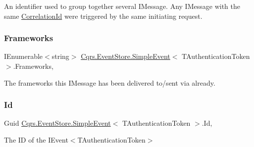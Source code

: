 An identifier used to group together several I\+Message. Any I\+Message with the same \hyperlink{classCqrs_1_1EventStore_1_1SimpleEvent_aa96b900b0fef8e6b2f6af81b5ce99f16_aa96b900b0fef8e6b2f6af81b5ce99f16}{Correlation\+Id} were triggered by the same initiating request. 

\mbox{\label{classCqrs_1_1EventStore_1_1SimpleEvent_ac9f0b878d05f7a3fde9560ae9477c9ec_ac9f0b878d05f7a3fde9560ae9477c9ec}} 
\subsubsection{\texorpdfstring{Frameworks}{Frameworks}}
{\footnotesize\ttfamily I\+Enumerable$<$string$>$ \hyperlink{classCqrs_1_1EventStore_1_1SimpleEvent}{Cqrs.\+Event\+Store.\+Simple\+Event}$<$ T\+Authentication\+Token $>$.Frameworks\hspace{0.3cm}{\ttfamily [get]}, {\ttfamily [set]}}



The frameworks this I\+Message has been delivered to/sent via already. 

\mbox{\label{classCqrs_1_1EventStore_1_1SimpleEvent_a7baf42c52ddbd269ae3739ddd7a777a4_a7baf42c52ddbd269ae3739ddd7a777a4}} 
\subsubsection{\texorpdfstring{Id}{Id}}
{\footnotesize\ttfamily Guid \hyperlink{classCqrs_1_1EventStore_1_1SimpleEvent}{Cqrs.\+Event\+Store.\+Simple\+Event}$<$ T\+Authentication\+Token $>$.Id\hspace{0.3cm}{\ttfamily [get]}, {\ttfamily [set]}}



The ID of the I\+Event$<$\+T\+Authentication\+Token$>$ 

\mbox{\label{classCqrs_1_1EventStore_1_1SimpleEvent_a4e07144de1cdb94bbbf1313eb0e1f35d_a4e07144de1cdb94bbbf1313eb0e1f35d}} 
